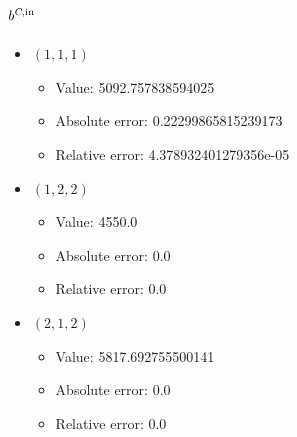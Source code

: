 \documentclass{article}%
\begin{document}
\subsection{$b^{\textsl{C},\text{in}}$}%
\begin{itemize}%
	\item $(1, 1, 1)$%
	\begin{itemize}%
		\item Value: 5092.757838594025%
		\item Absolute error: 0.22299865815239173%
		\item Relative error: 4.378932401279356e-05%
	\end{itemize}%
	\item $(1, 2, 2)$%
	\begin{itemize}%
		\item Value: 4550.0%
		\item Absolute error: 0.0%
		\item Relative error: 0.0%
	\end{itemize}%
	\item $(2, 1, 2)$%
	\begin{itemize}%
		\item Value: 5817.692755500141%
		\item Absolute error: 0.0%
		\item Relative error: 0.0%
	\end{itemize}%
\end{itemize}%
\end{document}
